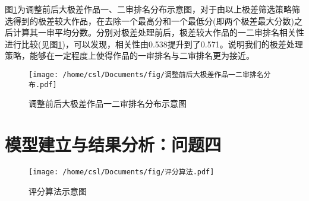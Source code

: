 \documentclass[bwprint]{gmcmthesis}
\begin{document}
图\ref{fig:调整前后大极差作品一二审排名分布示意图}为调整前后大极差作品一、二审排名分布示意图，对于由以上极差筛选策略筛选得到的极差较大作品，在去除一个最高分和一个最低分(即两个极差最大分数)之后计算其一审平均分数。分别对极差处理前后，极差较大作品的一二审排名相关性进行比较(见图\ref{fig:调整前后大极差作品一二审排名分布示意图})，可以发现，相关性由0.538提升到了0.571。说明我们的极差处理策略，能够在一定程度上使得作品的一审排名与二审排名更为接近。

\begin{figure}[h]
	\centering
	\texttt{[image: /home/csl/Documents/fig/调整前后大极差作品一二审排名分布.pdf]}
	\caption{\normf 调整前后大极差作品一二审排名分布示意图}
	\label{fig:调整前后大极差作品一二审排名分布示意图}
\end{figure}

\newpage
\section{模型建立与结果分析：问题四 }
\begin{figure}[h]
	\centering
	\texttt{[image: /home/csl/Documents/fig/评分算法.pdf]}
	\caption{\normf 评分算法示意图}
	\label{fig:评分算法示意图}
\end{figure}
\end{document}

